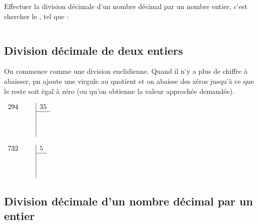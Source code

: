 \begin{mydef}
	Effectuer la division décimale d'un nombre décimal par un nombre entier, c'est chercher le \hspace*{4cm}, tel que : 
	
	\begin{equation*}
	\end{equation*}
\end{mydef}

\subsection{Division décimale de deux entiers}

\begin{mymeth}
	On commence comme une division euclidienne. Quand il n'y a plus de chiffre à abaisser, pn ajoute une virgule au quotient et on abaisse des zéros jusqu'à ce que le reste soit égal à zéro (ou qu'on obtienne la valeur approchée demandée).
\end{mymeth}

\begin{myexs}
	\begin{multicols}{2}
		\begin{center}
					$\begin{array}{rc|c}
					294 \quad & & 35 \\
					\cline{3-3}
					 &  \\
					 & & \\
					 & & \\
					\end{array}$
		\end{center}
		
		
		\begin{center}
			$\begin{array}{rc|c}
			732 \quad & & 5 \\
			\cline{3-3}
			&  \\
			& & \\
			& & \\
			\end{array}$
			
		\end{center}
		
	\end{multicols}
\end{myexs}


\subsection{Division décimale d'un nombre décimal par un entier}

